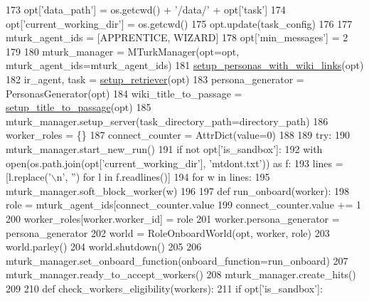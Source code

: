 \begin{DoxyCode}
173         opt[\textcolor{stringliteral}{'data\_path'}] = os.getcwd() + \textcolor{stringliteral}{'/data/'} + opt[\textcolor{stringliteral}{'task'}]
174         opt[\textcolor{stringliteral}{'current\_working\_dir'}] = os.getcwd()
175     opt.update(task\_config)
176 
177     mturk\_agent\_ids = [APPRENTICE, WIZARD]
178     opt[\textcolor{stringliteral}{'min\_messages'}] = 2
179 
180     mturk\_manager = MTurkManager(opt=opt, mturk\_agent\_ids=mturk\_agent\_ids)
181     \hyperlink{namespaceparlai_1_1mturk_1_1tasks_1_1wizard__of__wikipedia_1_1run_a5c16caa932230f93c418facd793be473}{setup\_personas\_with\_wiki\_links}(opt)
182     ir\_agent, task = \hyperlink{namespaceparlai_1_1mturk_1_1tasks_1_1wizard__of__wikipedia_1_1run_a22eb017ecd8f1a211fc5aac511d3102e}{setup\_retriever}(opt)
183     persona\_generator = PersonasGenerator(opt)
184     wiki\_title\_to\_passage = \hyperlink{namespaceparlai_1_1mturk_1_1tasks_1_1wizard__of__wikipedia_1_1run_a59836c3be93d4b491fa9ddecbb4e83c0}{setup\_title\_to\_passage}(opt)
185     mturk\_manager.setup\_server(task\_directory\_path=directory\_path)
186     worker\_roles = \{\}
187     connect\_counter = AttrDict(value=0)
188 
189     \textcolor{keywordflow}{try}:
190         mturk\_manager.start\_new\_run()
191         \textcolor{keywordflow}{if} \textcolor{keywordflow}{not} opt[\textcolor{stringliteral}{'is\_sandbox'}]:
192             with open(os.path.join(opt[\textcolor{stringliteral}{'current\_working\_dir'}], \textcolor{stringliteral}{'mtdont.txt'})) \textcolor{keyword}{as} f:
193                 lines = [l.replace(\textcolor{stringliteral}{'\(\backslash\)n'}, \textcolor{stringliteral}{''}) \textcolor{keywordflow}{for} l \textcolor{keywordflow}{in} f.readlines()]
194                 \textcolor{keywordflow}{for} w \textcolor{keywordflow}{in} lines:
195                     mturk\_manager.soft\_block\_worker(w)
196 
197         \textcolor{keyword}{def }run\_onboard(worker):
198             role = mturk\_agent\_ids[connect\_counter.value %
199             connect\_counter.value += 1
200             worker\_roles[worker.worker\_id] = role
201             worker.persona\_generator = persona\_generator
202             world = RoleOnboardWorld(opt, worker, role)
203             world.parley()
204             world.shutdown()
205 
206         mturk\_manager.set\_onboard\_function(onboard\_function=run\_onboard)
207         mturk\_manager.ready\_to\_accept\_workers()
208         mturk\_manager.create\_hits()
209 
210         \textcolor{keyword}{def }check\_workers\_eligibility(workers):
211             \textcolor{keywordflow}{if} opt[\textcolor{stringliteral}{'is\_sandbox'}]:

\end{DoxyCode}

